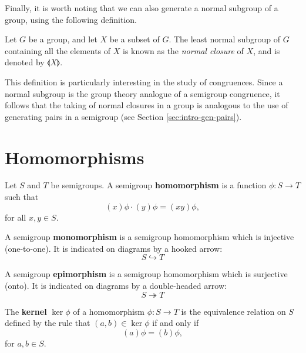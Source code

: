 Finally, it is worth noting that we can also generate a normal subgroup of a
group, using the following definition.

\begin{definition}
  \label{def:normal-closure}
  \label{normal closure}
  Let $G$ be a group, and let $X$ be a subset of $G$.  The least normal subgroup
  of $G$ containing all the elements of $X$ is known as the \textit{normal
    closure} of $X$, and is denoted by $\llangle X \rrangle$.
\end{definition}

This definition is particularly interesting in the study of congruences.  Since
a normal subgroup is the group theory analogue of a semigroup congruence, it
follows that the taking of normal closures in a group is analogous to the use of
generating pairs in a semigroup (see Section \ref{sec:intro-gen-pairs}).

\section{Homomorphisms}
\label{sec:homomorphisms}

\begin{definition}
  \label{def:homomorphism}
  Let $S$ and $T$ be semigroups.  A semigroup \textbf{homomorphism} is a
  function $\phi: S \to T$ such that
  $$(x)\phi \cdot (y)\phi = (xy)\phi,$$
  for all $x, y \in S$.
\end{definition}

\begin{definition}
  \label{def:monomorphism}
  A semigroup \textbf{monomorphism} is a semigroup homomorphism which is
  injective (one-to-one).  It is indicated on diagrams by a hooked arrow:
  $$S \hookrightarrow T$$
\end{definition}

\begin{definition}
  \label{def:epimorphism}
  A semigroup \textbf{epimorphism} is a semigroup homomorphism which is
  surjective (onto).  It is indicated on diagrams by a double-headed arrow:
  $$S \twoheadrightarrow T$$
\end{definition}

\begin{definition}
  \label{def:kernel}
  The \textbf{kernel} $\ker\phi$ of a homomorphism $\phi:S \to T$ is the
  equivalence relation on $S$ defined by the rule that $(a,b) \in \ker\phi$ if
  and only if
  $$(a)\phi = (b)\phi,$$
  for $a, b \in S$.
\end{definition}

